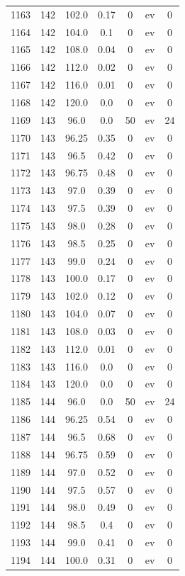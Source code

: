 \documentclass[12pt,a4paper]{article}
\begin{document}
\begin{tabular}{r|cccccc}
	1163 & 142 & 102.0 & 0.17 & 0 & ev & 0 \\
	1164 & 142 & 104.0 & 0.1 & 0 & ev & 0 \\
	1165 & 142 & 108.0 & 0.04 & 0 & ev & 0 \\
	1166 & 142 & 112.0 & 0.02 & 0 & ev & 0 \\
	1167 & 142 & 116.0 & 0.01 & 0 & ev & 0 \\
	1168 & 142 & 120.0 & 0.0 & 0 & ev & 0 \\
	1169 & 143 & 96.0 & 0.0 & 50 & ev & 24 \\
	1170 & 143 & 96.25 & 0.35 & 0 & ev & 0 \\
	1171 & 143 & 96.5 & 0.42 & 0 & ev & 0 \\
	1172 & 143 & 96.75 & 0.48 & 0 & ev & 0 \\
	1173 & 143 & 97.0 & 0.39 & 0 & ev & 0 \\
	1174 & 143 & 97.5 & 0.39 & 0 & ev & 0 \\
	1175 & 143 & 98.0 & 0.28 & 0 & ev & 0 \\
	1176 & 143 & 98.5 & 0.25 & 0 & ev & 0 \\
	1177 & 143 & 99.0 & 0.24 & 0 & ev & 0 \\
	1178 & 143 & 100.0 & 0.17 & 0 & ev & 0 \\
	1179 & 143 & 102.0 & 0.12 & 0 & ev & 0 \\
	1180 & 143 & 104.0 & 0.07 & 0 & ev & 0 \\
	1181 & 143 & 108.0 & 0.03 & 0 & ev & 0 \\
	1182 & 143 & 112.0 & 0.01 & 0 & ev & 0 \\
	1183 & 143 & 116.0 & 0.0 & 0 & ev & 0 \\
	1184 & 143 & 120.0 & 0.0 & 0 & ev & 0 \\
	1185 & 144 & 96.0 & 0.0 & 50 & ev & 24 \\
	1186 & 144 & 96.25 & 0.54 & 0 & ev & 0 \\
	1187 & 144 & 96.5 & 0.68 & 0 & ev & 0 \\
	1188 & 144 & 96.75 & 0.59 & 0 & ev & 0 \\
	1189 & 144 & 97.0 & 0.52 & 0 & ev & 0 \\
	1190 & 144 & 97.5 & 0.57 & 0 & ev & 0 \\
	1191 & 144 & 98.0 & 0.49 & 0 & ev & 0 \\
	1192 & 144 & 98.5 & 0.4 & 0 & ev & 0 \\
	1193 & 144 & 99.0 & 0.41 & 0 & ev & 0 \\
	1194 & 144 & 100.0 & 0.31 & 0 & ev & 0 \\

\end{tabular}
\end{document}
